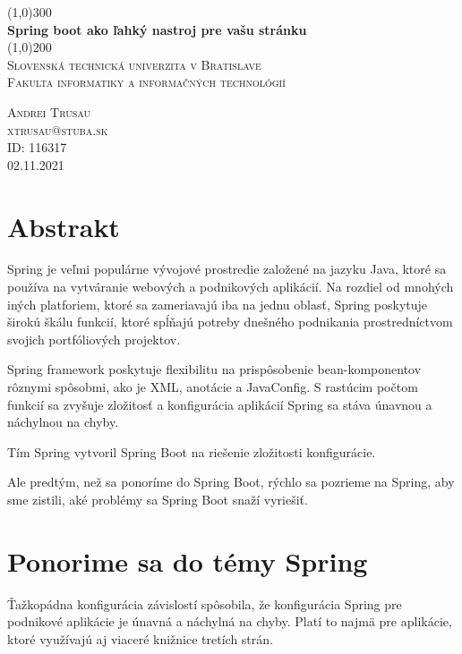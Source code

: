 \documentclass[12pt, letterpaper]{article}
\begin{document}
\begin{titlepage}
	\begin{center}	
	\line(1,0){300} \\
	[0.25in]
	\huge{\bfseries \huge Spring boot ako ľahký nastroj pre vašu stránku} \\
	[2mm]
	\line(1,0){200} \\
	[2cm]
	\textsc{\large Slovenská technická univerzita v Bratislave \\ Fakulta informatiky a informačných technológií} \\
	[8cm]
	\end{center}
	\begin{flushright}
	\textsc{\large Andrei Trusau \\ xtrusau@stuba.sk\\ ID: 116317 \\ 02.11.2021 \\}
	\end{flushright}
\end{titlepage}
\tableofcontents
\thispagestyle{empty}
\cleardoublepage
\setcounter{page}{1}


\section{Abstrakt}\label{sec:intro}
Spring je veľmi populárne vývojové prostredie založené na jazyku Java, ktoré sa používa na vytváranie webových a podnikových aplikácií. Na rozdiel od mnohých iných platforiem, ktoré sa zameriavajú iba na jednu oblasť, Spring poskytuje širokú škálu funkcií, ktoré spĺňajú potreby dnešného podnikania prostredníctvom svojich portfóliových projektov.

Spring framework poskytuje flexibilitu na prispôsobenie bean-komponentov rôznymi spôsobmi, ako je XML, anotácie a JavaConfig. S rastúcim počtom funkcií sa zvyšuje zložitosť a konfigurácia aplikácií Spring sa stáva únavnou a náchylnou na chyby.

Tím Spring vytvoril Spring Boot na riešenie zložitosti konfigurácie. 

Ale predtým, než sa ponoríme do Spring Boot, rýchlo sa pozrieme na Spring, aby sme zistili, aké problémy sa Spring Boot snaží vyriešiť.\\
\newpage

\section{Ponorime sa do témy Spring}
Ťažkopádna konfigurácia závislostí spôsobila, že konfigurácia Spring pre podnikové aplikácie je únavná a náchylná na chyby. Platí to najmä pre aplikácie, ktoré využívajú aj viaceré knižnice tretích strán.	
\end{document}
